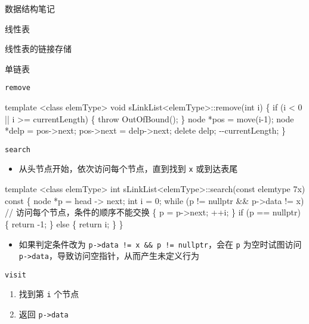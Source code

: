 \documentclass[
  ignorenonframetext,
]{beamer}
\newenvironment{Shaded}{}{}
\newcommand{\NormalTok}[1]{#1}
\providecommand{\tightlist}{%
  \setlength{\itemsep}{0pt}\setlength{\parskip}{0pt}}
\begin{document}
\begin{frame}[fragile]{数据结构笔记}
\begin{block}{线性表}
\begin{block}{线性表的链接存储}
\begin{block}{单链表}
\begin{block}{\texttt{remove}}
\begin{Shaded}
\begin{Highlighting}[]
\NormalTok{template \textless{}class elemType\textgreater{}}
\NormalTok{void sLinkList\textless{}elemType\textgreater{}::remove(int i)}
\NormalTok{\{}
\NormalTok{  if (i \textless{} 0 || i \textgreater{}= currentLength)}
\NormalTok{  \{}
\NormalTok{    throw OutOfBound();}
\NormalTok{  \}}
\NormalTok{  node *pos = move(i{-}1);}
\NormalTok{  node *delp = pos{-}\textgreater{}next;}
\NormalTok{  pos{-}\textgreater{}next = delp{-}\textgreater{}next;}
\NormalTok{  delete delp;}
\NormalTok{  {-}{-}currentLength;}
\NormalTok{\}}
\end{Highlighting}
\end{Shaded}
\end{block}

\begin{block}{\texttt{search}}
\protect{}\label{search-1}
\begin{itemize}
\tightlist
\item
  从头节点开始，依次访问每个节点，直到找到 \texttt{x} 或到达表尾
\end{itemize}

\begin{Shaded}
\begin{Highlighting}[]
\NormalTok{template \textless{}class elemType\textgreater{}}
\NormalTok{int sLinkList\textless{}elemType\textgreater{}::search(const elemtype 7x) const}
\NormalTok{\{}
\NormalTok{  node *p = head {-}\textgreater{} next;}
\NormalTok{  int i = 0;}
\NormalTok{  while (p != nullptr \&\& p{-}\textgreater{}data != x) // 访问每个节点，条件的顺序不能交换}
\NormalTok{  \{}
\NormalTok{    p = p{-}\textgreater{}next;}
\NormalTok{    ++i;}
\NormalTok{  \}}
\NormalTok{  if (p == nullptr)}
\NormalTok{  \{}
\NormalTok{    return {-}1;}
\NormalTok{  \}}
\NormalTok{  else}
\NormalTok{  \{}
\NormalTok{    return i;}
\NormalTok{  \}}
\NormalTok{\}}
\end{Highlighting}
\end{Shaded}

\begin{itemize}
\tightlist
\item
  如果判定条件改为
  \texttt{p-\textgreater{}data\ !=\ x\ \&\&\ p\ !=\ nullptr}，会在
  \texttt{p} 为空时试图访问
  \texttt{p-\textgreater{}data}，导致访问空指针，从而产生未定义行为
\end{itemize}
\end{block}

\begin{block}{\texttt{visit}}
\protect{}\label{visit}
\begin{enumerate}
\tightlist
\item
  找到第 \texttt{i} 个节点
\item
  返回 \texttt{p-\textgreater{}data}
\end{enumerate}


\end{block}
\end{block}
\end{block}
\end{block}
\end{frame}
\end{document}
